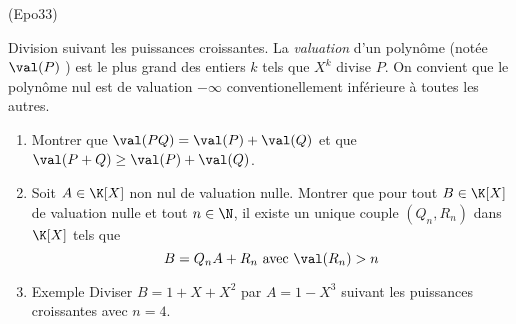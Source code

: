 \begin{tiny}(Epo33)\end{tiny} Division suivant les puissances croissantes.\newline
La \emph{valuation} d'un polynôme (notée $\val(P)$ ) est le plus grand des entiers $k$ tels que $X^k$ divise $P$. On convient que le polynôme nul est de valuation $-\infty$ conventionellement inférieure à toutes les autres.
\begin{enumerate}
 \item Montrer que $\val(PQ)=\val(P)+\val(Q)$ et que $\val(P+Q)\geq \val(P)+\val(Q)$.
 \item Soit $A\in \K[X]$ non nul de valuation nulle. Montrer que pour tout $B\in \K[X]$ de valuation nulle et tout $n\in \N$, il existe un unique couple $(Q_n,R_n)$ dans $\K[X]$ tels que
\begin{displaymath}
 B = Q_n A + R_n \text{ avec  } \val(R_n)>n
\end{displaymath}
\item Exemple Diviser $B=1+X+X^2$ par $A=1-X^3$ suivant les puissances croissantes avec $n=4$.
\end{enumerate}
